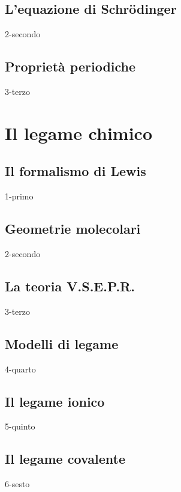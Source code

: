 \documentclass[openany,12pt]{book}%
\begin{document}
    \section{L'equazione di Schrödinger}
    {2-secondo}

    \newpage

  \section{Proprietà periodiche}
    {3-terzo}

\chapter{Il legame chimico}

  \section{Il formalismo di Lewis}
    {1-primo}

    \newpage

  \section{Geometrie molecolari}
    {2-secondo}

    \newpage

  \section{La teoria V.S.E.P.R.}
    {3-terzo}

    \newpage

  \section{Modelli di legame}
    {4-quarto}

    \newpage

  \section{Il legame ionico}
    {5-quinto}

    \newpage

  \section{Il legame covalente}
    {6-sesto}
\end{document}
